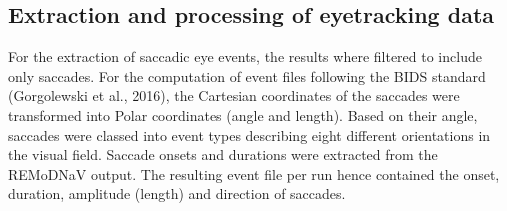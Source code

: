 \documentclass[a4paper, 11pt]{scrreprt}
\begin{document}
\subsection{Extraction and processing of eyetracking data}

For the extraction of saccadic eye events, the results where filtered to include only saccades. For the computation of event files following the BIDS standard (Gorgolewski et al., 2016), the Cartesian coordinates of the saccades were transformed into Polar coordinates (angle and length). Based on their angle, saccades were classed into event types describing eight different orientations in the visual field. Saccade onsets and durations were extracted from the REMoDNaV output. The resulting event file per run hence contained the onset, duration, amplitude (length) and direction of saccades. \newline
\end{document}
